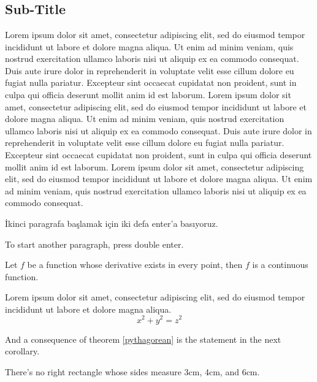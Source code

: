 
\chapter{\intro}

\section{Sub-Title}
Lorem ipsum dolor sit amet, consectetur adipiscing elit, sed do eiusmod tempor incididunt ut labore et dolore magna aliqua. Ut enim ad minim veniam, quis nostrud exercitation ullamco laboris nisi ut aliquip ex ea commodo consequat. Duis aute irure dolor in reprehenderit in voluptate velit esse cillum dolore eu fugiat nulla pariatur. Excepteur sint occaecat cupidatat non proident, sunt in culpa qui officia deserunt mollit anim id est laborum. Lorem ipsum dolor sit amet, consectetur adipiscing elit, sed do eiusmod tempor incididunt ut labore et dolore magna aliqua. Ut enim ad minim veniam, quis nostrud exercitation ullamco laboris nisi ut aliquip ex ea commodo consequat. Duis aute irure dolor in reprehenderit in voluptate velit esse cillum dolore eu fugiat nulla pariatur. Excepteur sint occaecat cupidatat non proident, sunt in culpa qui officia deserunt mollit anim id est laborum.   Lorem ipsum dolor sit amet, consectetur adipiscing elit, sed do eiusmod tempor incididunt ut labore et dolore magna aliqua. Ut enim ad minim veniam, quis nostrud exercitation ullamco laboris nisi ut aliquip ex ea commodo consequat. 

İkinci paragrafa başlamak için iki defa enter'a basıyoruz.

To start another paragraph, press double enter.

\begin{theorem}
Let $f$ be a function whose derivative exists in every point, then $f$ is 
a continuous function.
\end{theorem}
 
\begin{theorem}
\label{pythagorean}
Lorem ipsum dolor sit amet, consectetur adipiscing elit, sed do eiusmod tempor incididunt ut labore et dolore magna aliqua.  
\begin{equation}
x^2 + y^2 = z^2
\end{equation}
\end{theorem}

And a consequence of theorem \ref{pythagorean} is the statement in the next 
corollary.
 
\begin{corollary}
There's no right rectangle whose sides measure 3cm, 4cm, and 6cm.
\end{corollary}
 

